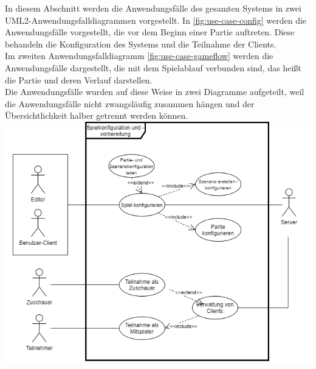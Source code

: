 \documentclass[12pt]{article}
\newcounter{fa}
\begin{document}
In diesem Abschnitt werden die Anwendungsfälle des gesamten Systems in zwei UML2-Anwendungsfalldiagrammen vorgestellt. In \autoref{fig:use-case-config} werden die Anwendungsfälle vorgestellt, die vor dem Beginn einer Partie auftreten. Diese behandeln die Konfiguration des Systems und die Teilnahme der Clients. \\ Im zweiten Anwendungsfalldiagramm \autoref{fig:use-case-gameflow} werden die Anwendungsfälle dargestellt, die mit dem Spielablauf verbunden sind, das heißt die Partie und deren Verlauf darstellen. \\ Die Anwendungsfälle wurden auf diese Weise in zwei Diagramme aufgeteilt, weil die Anwendungsfälle nicht zwangsläufig zusammen hängen und der Übersichtlichkeit halber getrennt werden können. \\ 

\centering
\includegraphics[width=\textwidth]{images/Anwendungsfalldiagramm_Konfiguration}
\label{fig:use-case-config}
\flushleft

\vspace{2cm}
\end{document}
